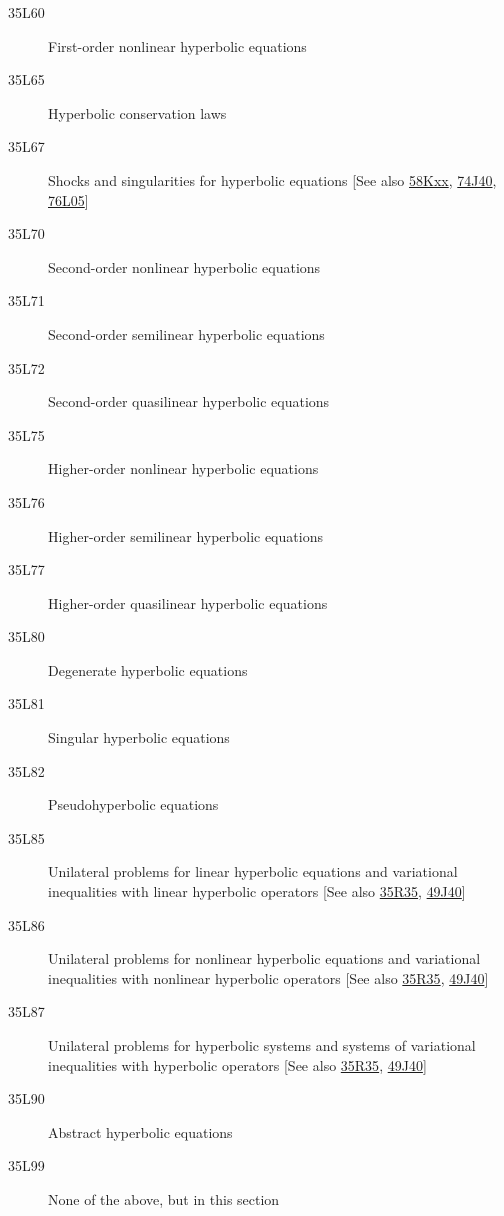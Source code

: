 \begin{description}
\item [35L60]\label{35L60} First-order nonlinear hyperbolic equations
\item [35L65]\label{35L65} Hyperbolic conservation laws
\item [35L67]\label{35L67} Shocks and singularities for hyperbolic equations [See also \hyperref[58Kxx]{58Kxx}, \hyperref[74J40]{74J40}, \hyperref[76L05]{76L05}]
\item [35L70]\label{35L70} Second-order nonlinear  hyperbolic equations
\item [35L71]\label{35L71} Second-order semilinear  hyperbolic equations
\item [35L72]\label{35L72} Second-order quasilinear  hyperbolic equations
\item [35L75]\label{35L75} Higher-order nonlinear hyperbolic equations
\item [35L76]\label{35L76} Higher-order semilinear  hyperbolic equations
\item [35L77]\label{35L77} Higher-order quasilinear  hyperbolic equations
\item [35L80]\label{35L80} Degenerate hyperbolic equations
\item [35L81]\label{35L81} Singular hyperbolic equations
\item [35L82]\label{35L82} Pseudohyperbolic equations
\item [35L85]\label{35L85} Unilateral problems for linear hyperbolic equations and variational inequalities with linear hyperbolic operators [See also \hyperref[35R35]{35R35}, \hyperref[49J40]{49J40}]
\item [35L86]\label{35L86} Unilateral problems for nonlinear hyperbolic  equations and variational inequalities with nonlinear hyperbolic operators [See also \hyperref[35R35]{35R35}, \hyperref[49J40]{49J40}]
\item [35L87]\label{35L87} Unilateral problems for hyperbolic systems and  systems of  variational inequalities with hyperbolic operators [See also \hyperref[35R35]{35R35}, \hyperref[49J40]{49J40}]
\item [35L90]\label{35L90} Abstract hyperbolic equations
\item [35L99]\label{35L99} None of the above, but in this section
\end{description}
